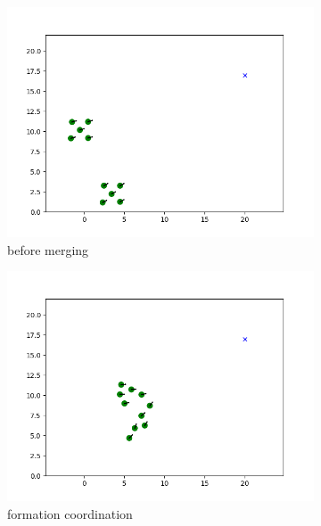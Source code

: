 \begin{figure}
     \centering
     \begin{subfigure}[b]{0.3\textwidth}
         \centering
         \includegraphics[width=\textwidth]{figures/merge_1.png}
         \caption{before merging}
         \label{fig:y equals x}
     \end{subfigure}
     \hfill
     \begin{subfigure}[b]{0.3\textwidth}
         \centering
         \includegraphics[width=\textwidth]{figures/merge_2.png}
         \caption{formation coordination}
         \label{fig:three sin x}
     \end{subfigure}
     \hfill
     \begin{subfigure}[b]{0.3\textwidth}

\end{subfigure}
\end{figure}
